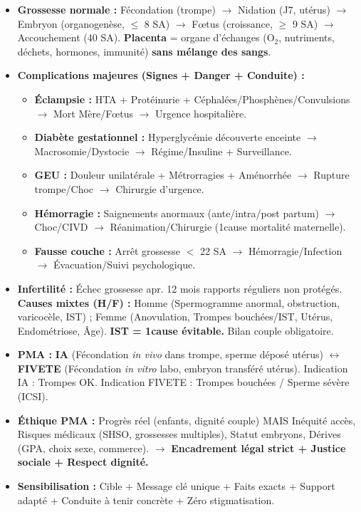 \documentclass[11pt]{article}
\begin{document}
\begin{aretenir}
\begin{itemize}
\item \textbf{Grossesse normale :} Fécondation (trompe) $\rightarrow$ Nidation (J7, utérus) $\rightarrow$ Embryon (organogenèse, $\le$ 8 SA) $\rightarrow$ Fœtus (croissance, $\ge$ 9 SA) $\rightarrow$ Accouchement (40 SA). \textbf{Placenta} = organe d'échanges (O$_2$, nutriments, déchets, hormones, immunité) \textbf{sans mélange des sangs}.
\item \textbf{Complications majeures (Signes + Danger + Conduite) :}
\begin{itemize}
\item \textbf{Éclampsie :} HTA + Protéinurie + Céphalées/Phosphènes/Convulsions $\rightarrow$ Mort Mère/Fœtus $\rightarrow$ Urgence hospitalière.
\item \textbf{Diabète gestationnel :} Hyperglycémie découverte enceinte $\rightarrow$ Macrosomie/Dystocie $\rightarrow$ Régime/Insuline + Surveillance.
\item \textbf{GEU :} Douleur unilatérale + Métrorragies + Aménorrhée $\rightarrow$ Rupture trompe/Choc $\rightarrow$ Chirurgie d'urgence.
\item \textbf{Hémorragie :} Saignements anormaux (ante/intra/post partum) $\rightarrow$ Choc/CIVD $\rightarrow$ Réanimation/Chirurgie (1\iere cause mortalité maternelle).
\item \textbf{Fausse couche :} Arrêt grossesse $<$ 22 SA $\rightarrow$ Hémorragie/Infection $\rightarrow$ Évacuation/Suivi psychologique.
\end{itemize}
\item \textbf{Infertilité :} Échec grossesse apr. 12 mois rapports réguliers non protégés. \textbf{Causes mixtes (H/F) :} Homme (Spermogramme anormal, obstruction, varicocèle, IST) ; Femme (Anovulation, Trompes bouchées/IST, Utérus, Endométriose, Âge). \textbf{IST = 1\iere cause évitable.} Bilan couple obligatoire.
\item \textbf{PMA :} \textbf{IA} (Fécondation \emph{in vivo} dans trompe, sperme déposé utérus) $\leftrightarrow$ \textbf{FIVETE} (Fécondation \emph{in vitro} labo, embryon transféré utérus). Indication IA : Trompes OK. Indication FIVETE : Trompes bouchées / Sperme sévère (ICSI).
\item \textbf{Éthique PMA :} Progrès réel (enfants, dignité couple) MAIS Inéquité accès, Risques médicaux (SHSO, grossesses multiples), Statut embryons, Dérives (GPA, choix sexe, commerce). $\rightarrow$ \textbf{Encadrement légal strict + Justice sociale + Respect dignité.}
\item \textbf{Sensibilisation :} Cible + Message clé unique + Faits exacts + Support adapté + Conduite à tenir concrète + Zéro stigmatisation.
\end{itemize}
\end{aretenir}
\end{document}

